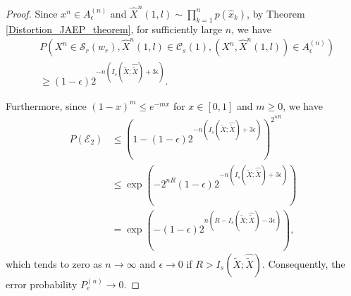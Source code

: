 \documentclass[12pt, draftclsnofoot,onecolumn]{IEEEtran}
\begin{document}
\begin{proof}

Since $x^n\in A_{\epsilon}^{(n)}$ and $\hat{X}^n(1,l)\sim \prod_{k=1}^{n}p(\hat{x}_k)$, by Theorem \ref{Distortion_JAEP_theorem}, for sufficiently large $n$, we have
\begin{equation}
\begin{aligned}
&P\left(X^n\in \mathcal{S}_r(w_r), \hat{X}^n(1,l)\in \mathcal{C}_s(1),(X^n, \hat{X}^n(1,l))\in A_{\epsilon}^{(n)}\right)\\
& \geq (1-\epsilon) 2^{-n(I_s(\tilde{X};\hat{\tilde{X}})+3\epsilon)}.
\end{aligned}
\end{equation}

Furthermore, since $(1-x)^m\leq e^{-mx}$ for $x\in [0,1]$ and $m\geq 0$, we have
\begin{equation}
\begin{aligned}
P(\mathcal{E}_2) & \leq \left(1-(1-\epsilon)2^{-n(I_s(\tilde{X};\hat{\tilde{X}})+3\epsilon)}\right)^{2^{nR}}\\
                           & \leq \exp\left(-2^{nR}(1-\epsilon)2^{-n(I_s(\tilde{X};\hat{\tilde{X}})+3\epsilon)}\right)\\
                           & =\exp\left(-(1-\epsilon)2^{n(R-I_s(\tilde{X};\hat{\tilde{X}})-3\epsilon)}\right),
\end{aligned}
\end{equation}
which tends to zero as $n\to\infty$ and $\epsilon\to0$ if $R>I_s(\tilde{X};\hat{\tilde{X}})$. Consequently, the error probability $P_e^{(n)}\to 0$.


\end{proof}
\end{document}
